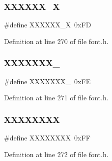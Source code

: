 \subsubsection{\texorpdfstring{X\+X\+X\+X\+X\+X\+\_\+X}{XXXXXX\_X}}
{\footnotesize\ttfamily \#define X\+X\+X\+X\+X\+X\+\_\+X~0x\+FD}



Definition at line 270 of file font.\+h.

\mbox{\label{a00101_a5651d1bed073d1b095ce14a1ea05bc7c_a5651d1bed073d1b095ce14a1ea05bc7c}} 
\subsubsection{\texorpdfstring{X\+X\+X\+X\+X\+X\+X\+\_\+}{XXXXXXX\_}}
{\footnotesize\ttfamily \#define X\+X\+X\+X\+X\+X\+X\+\_\+~0x\+FE}



Definition at line 271 of file font.\+h.

\mbox{\label{a00101_a55c94e4ed6fb2908c9665c8c3ba27ed8_a55c94e4ed6fb2908c9665c8c3ba27ed8}} 
\subsubsection{\texorpdfstring{X\+X\+X\+X\+X\+X\+XX}{XXXXXXXX}}
{\footnotesize\ttfamily \#define X\+X\+X\+X\+X\+X\+XX~0x\+FF}



Definition at line 272 of file font.\+h.

